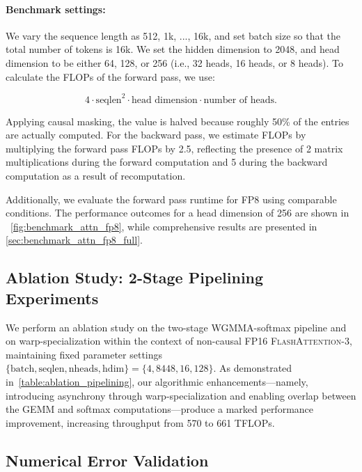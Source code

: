 \paragraph{Benchmark settings:} We vary the sequence length as 512, 1k, ..., 16k, and set batch size so that the total number of tokens is 16k. We set the hidden dimension to 2048, and head dimension to be either 64, 128, or 256 (i.e., 32 heads, 16 heads, or 8 heads). To calculate the FLOPs of the forward pass, we use:

\begin{equation*}
  4 \cdot \text{seqlen}^2 \cdot \text{head dimension} \cdot \text{number of heads}.
\end{equation*}

Applying causal masking, the value is halved because roughly 50\% of the entries are actually computed. For the backward pass, we estimate FLOPs by multiplying the forward pass FLOPs by 2.5, reflecting the presence of 2 matrix multiplications during the forward computation and 5 during the backward computation as a result of recomputation.

Additionally, we evaluate the forward pass runtime for FP8 using comparable conditions. The performance outcomes for a head dimension of 256 are shown in ~\cref{fig:benchmark_attn_fp8}, while comprehensive results are presented in \cref{sec:benchmark_attn_fp8_full}.

\subsection{Ablation Study: 2-Stage Pipelining Experiments}
\label{sec:2-stage-pipelining-experiments}

We perform an ablation study on the two-stage WGMMA-softmax pipeline and on warp-specialization within the context of non-causal FP16 \textsc{FlashAttention-3}, maintaining fixed parameter settings $\{\text{batch}, \text{seqlen}, \text{nheads}, \text{hdim}\} = \{ 4, 8448, 16, 128\}$. As demonstrated in~\cref{table:ablation_pipelining}, our algorithmic enhancements—namely, introducing asynchrony through warp-specialization and enabling overlap between the GEMM and softmax computations—produce a marked performance improvement, increasing throughput from 570 to 661 TFLOPs.

\subsection{Numerical Error Validation}
\label{sec:numerical_error}

